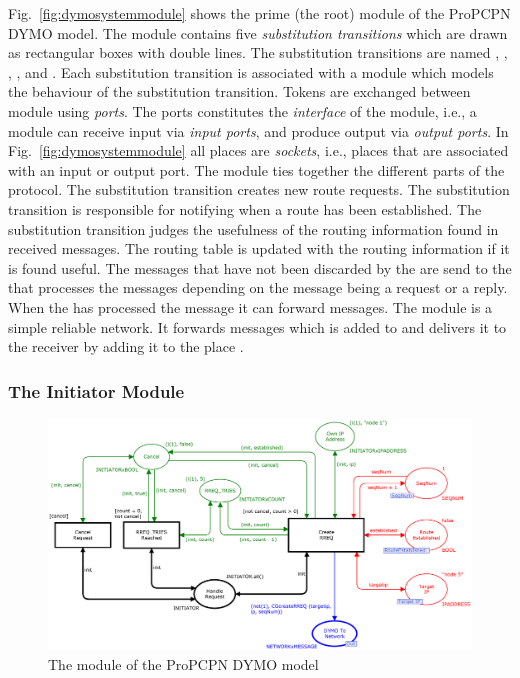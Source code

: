 Fig.~\ref{fig:dymosystemmodule} shows the prime (the root) module  of the ProPCPN DYMO model. The  module contains five \emph{substitution transitions} which are drawn as rectangular boxes with double lines. The substitution transitions are named , , , , and . Each substitution transition is associated with a module which models the behaviour of the substitution transition. Tokens are exchanged between module using \emph{ports}. The ports constitutes the \emph{interface} of the module, i.e., a module can receive input via \emph{input ports}, and produce output via \emph{output ports}. In Fig.~\ref{fig:dymosystemmodule} all places are \emph{sockets}, i.e., places that are associated with an input or output port. The  module ties together the different parts of the protocol. The  substitution transition creates new route requests. The  substitution transition is responsible for notifying when a route has been established. The  substitution transition judges the usefulness of the routing information found in received messages. The routing table is updated with the routing information if it is found useful. The messages that have not been discarded by the  are send to the  that processes the messages depending on the message being a request or a reply. When the  has processed the message it can forward messages. The  module is a simple reliable network. It forwards messages which is added to  and delivers it to the receiver by adding it to the place .

\subsubsection{The Initiator Module}

\begin{figure}[b!]
\centering
\includegraphics[width=\textwidth]{dymo/graphics/initiatormodule.eps}
\caption{The  module of the ProPCPN DYMO model}
\label{fig:initiatormodule}
\end{figure}

